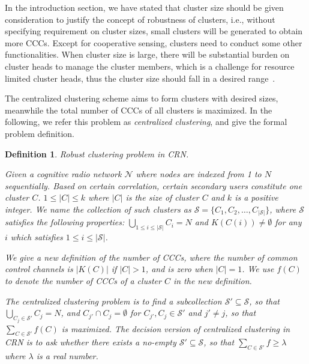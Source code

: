 \documentclass[10pt,journal,compsoc]{IEEEtran}
\theoremstyle{mytheoremstyle}
\theoremstyle{mytheoremstyle}
\theoremstyle{mytheoremstyle}
\newtheorem{mydef}{Definition}%
\newcommand{\ie}{i.e., }
\begin{document}


In the introduction section, we have stated that cluster size should be given consideration to justify the concept of robustness of clusters, \ie without specifying requirement on cluster sizes, small clusters will be generated to obtain more CCCs.
Except for cooperative sensing, clusters need to conduct some other functionalities.
When cluster size is large, there will be substantial burden on cluster heads to manage the cluster members, which is a challenge for resource limited cluster heads, thus the cluster size should fall in a desired range~\cite{Chen04clusteringalgorithms, capacity_cluster_06}.

The centralized clustering scheme aims to form clusters with desired sizes, meanwhile the total number of CCCs of all clusters is maximized.
In the following, we refer this problem as \textit{centralized clustering}, and give the formal problem definition. 


\begin{mydef}
\label{def_centralized_clustering}
\textit{Robust clustering problem in CRN.}

Given a cognitive radio network $\mathcal{N}$ where nodes are indexed from 1 to $N$ sequentially.
Based on certain correlation, certain secondary users constitute one cluster $C$.
$1\leq |C| \leqslant k$ where $|C|$ is the size of cluster $C$ and $k$ is a positive integer.
We name the collection of such clusters as $\mathcal{S}=\{C_1, C_2,\ldots,C_{|\mathcal{S}|}\}$, where $\mathcal{S}$ satisfies the following properties: $\bigcup_{1\leq i \leq |\mathcal{S}|} C_i = N$ and $K(C(i))\neq \emptyset$ for any $i$ which satisfies $1\leq i \leq |\mathcal{S}|$.

We give a new definition of the number of CCCs, where the number of common control channels is $|K(C)|$ if $|C|>1$, and is zero when $|C|=1$.
We use $f(C)$ to denote the number of CCCs of a cluster $C$ in the new definition.

The centralized clustering problem is to find a subcollection $\mathcal{S}' \subseteq \mathcal{S}$, so that $\bigcup_{C_j\in \mathcal{S}'} C_j = N$, and $C_{j'}\cap C_j =\emptyset$ for $C_{j'}, C_j\in \mathcal{S}'$ and $j'\neq j$, so that $\sum_{C\in \mathcal{S}'} f(C)$ is maximized.
The decision version of centralized clustering in CRN is to ask whether there exists a no-empty $\mathcal{S}'\subseteq \mathcal{S}$, so that $\sum_{C\in \mathcal{S}'} f \geqslant \lambda$ where $\lambda$ is a real number.%
\end{mydef}
\end{document}

